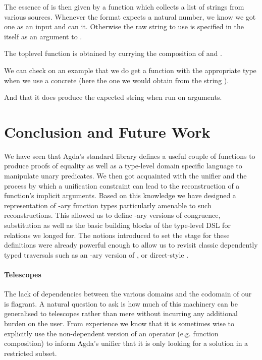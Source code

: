 {

The essence of  is then given by a function  which
collects a list of strings from various sources. Whenever the format expects
a natural number, we know we got one as an input and can  it.
Otherwise the raw string to use is specified in the  itself as
an argument to .


The toplevel function is obtained by currying the composition of
 and .


We can check on an example that we do get a function with the appropriate
type when we use a concrete  (here the one we would obtain from
the string ).


And that it does produce the expected string when run on arguments.


\section{Conclusion and Future Work}

We have seen that Agda's standard library defines a useful couple of functions
to produce proofs of equality as well as a type-level domain specific language
to manipulate unary predicates. We then got acquainted with the unifier and the
process by which a unification constraint can lead to the reconstruction of a
function's implicit arguments. Based on this knowledge we have designed a
representation of -ary function types particularly amenable to such
reconstructions. This allowed us to define -ary versions of congruence,
substitution as well as the basic building blocks of the type-level DSL for
relations we longed for. The notions introduced to set the stage for these
definitions were already powerful enough to allow us to revisit classic
dependently typed traversals such as an -ary version of ,
or direct-style .

\paragraph{Telescopes} The lack of dependencies between the various domains
and the codomain of our  is flagrant. A natural question to ask
is how much of this machinery can be generalised to telescopes rather than
mere  without incurring any additional burden on the user. From
experience we know that it is sometimes wise to explicitly use the
non-dependent version of an operator (e.g. function composition) to inform
Agda's unifier that it is only looking for a solution in a restricted
subset.

}
